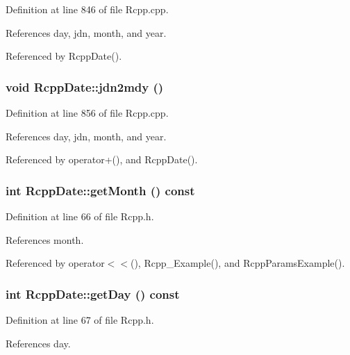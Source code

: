 Definition at line 846 of file Rcpp.cpp.

References day, jdn, month, and year.

Referenced by RcppDate().\hypertarget{classRcppDate_ca9e6ccbf5bf76e9bba92f2a3083c135}{
\subsubsection[jdn2mdy]{\setlength{\rightskip}{0pt plus 5cm}void RcppDate::jdn2mdy ()}}
\label{classRcppDate_ca9e6ccbf5bf76e9bba92f2a3083c135}




Definition at line 856 of file Rcpp.cpp.

References day, jdn, month, and year.

Referenced by operator+(), and RcppDate().\hypertarget{classRcppDate_16ca2d57a2c4047b027c8b8b0db5184f}{
\subsubsection[getMonth]{\setlength{\rightskip}{0pt plus 5cm}int RcppDate::getMonth () const}}
\label{classRcppDate_16ca2d57a2c4047b027c8b8b0db5184f}




Definition at line 66 of file Rcpp.h.

References month.

Referenced by operator$<$$<$(), Rcpp\_\-Example(), and RcppParamsExample().\hypertarget{classRcppDate_20efbcdddceac536425407b3169fff5a}{
\subsubsection[getDay]{\setlength{\rightskip}{0pt plus 5cm}int RcppDate::getDay () const}}
\label{classRcppDate_20efbcdddceac536425407b3169fff5a}




Definition at line 67 of file Rcpp.h.

References day.

